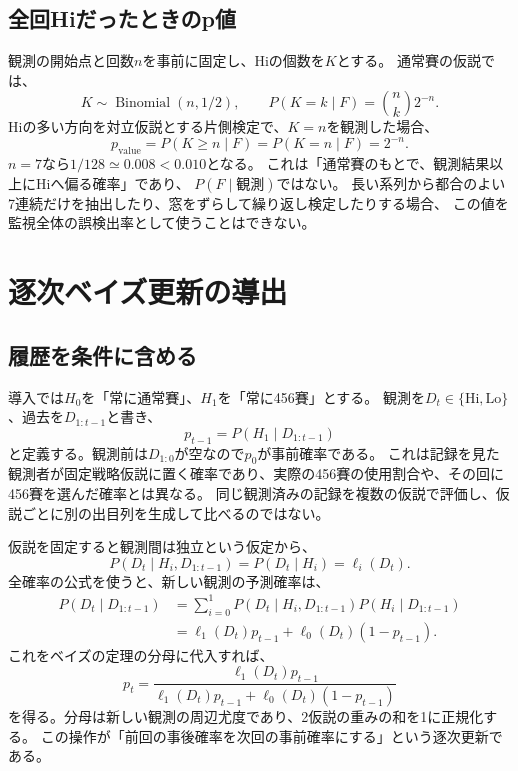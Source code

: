 \documentclass[11pt,a4paper]{article}
\numberwithin{equation}{section}
\newcommand{\HH}{\mathrm{Hi}}
\newcommand{\LL}{\mathrm{Lo}}
\begin{document}
\subsection{全回Hiだったときのp値}
観測の開始点と回数$n$を事前に固定し、Hiの個数を$K$とする。
通常賽の仮説では、
\begin{equation}
K\sim\operatorname{Binomial}(n,1/2),\qquad
P(K=k\mid F)=\binom nk2^{-n}.
\end{equation}
Hiの多い方向を対立仮説とする片側検定で、$K=n$を観測した場合、
\begin{equation}
p_{\mathrm{value}}
=P(K\ge n\mid F)
=P(K=n\mid F)
=2^{-n}.
\end{equation}
$n=7$なら$1/128\simeq0.008<0.010$となる。
これは「通常賽のもとで、観測結果以上にHiへ偏る確率」であり、
$P(F\mid\text{観測})$ではない。
長い系列から都合のよい7連続だけを抽出したり、窓をずらして繰り返し検定したりする場合、
この値を監視全体の誤検出率として使うことはできない。

\section{逐次ベイズ更新の導出}
\subsection{履歴を条件に含める}
導入では$H_0$を「常に通常賽」、$H_1$を「常に456賽」とする。
観測を$D_t\in\{\HH,\LL\}$、過去を$D_{1:t-1}$と書き、
\begin{equation}
p_{t-1}=P(H_1\mid D_{1:t-1})
\end{equation}
と定義する。観測前は$D_{1:0}$が空なので$p_0$が事前確率である。
これは記録を見た観測者が固定戦略仮説に置く確率であり、実際の456賽の使用割合や、その回に456賽を選んだ確率とは異なる。
同じ観測済みの記録を複数の仮説で評価し、仮説ごとに別の出目列を生成して比べるのではない。

仮説を固定すると観測間は独立という仮定から、
\begin{equation}
P(D_t\mid H_i,D_{1:t-1})=P(D_t\mid H_i)=\ell_i(D_t).
\end{equation}
全確率の公式を使うと、新しい観測の予測確率は、
\begin{align}
P(D_t\mid D_{1:t-1})
&=\sum_{i=0}^{1}P(D_t\mid H_i,D_{1:t-1})
                         P(H_i\mid D_{1:t-1})\\
&=\ell_1(D_t)p_{t-1}+\ell_0(D_t)(1-p_{t-1}).
\end{align}
これをベイズの定理の分母に代入すれば、
\begin{equation}
\boxed{
p_t=
\frac{\ell_1(D_t)p_{t-1}}
{\ell_1(D_t)p_{t-1}+\ell_0(D_t)(1-p_{t-1})}
}
\label{eq:update}
\end{equation}
を得る。分母は新しい観測の周辺尤度であり、2仮説の重みの和を1に正規化する。
この操作が「前回の事後確率を次回の事前確率にする」という逐次更新である。
\end{document}
